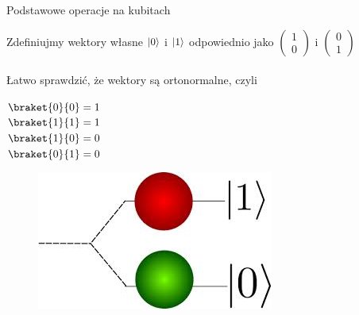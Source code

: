 \documentclass{beamer}
\DeclarePairedDelimiter\ket{\lvert}{\rangle}
\begin{document}
	
	\begin{frame}{Podstawowe operacje na kubitach}
		\begin{block}{   }
			\vspace{0.5em}
			Zdefiniujmy wektory własne $\ket{0}$ i $\ket{1}$ odpowiednio jako
			$\begin{pmatrix}
				1\\
				0
			\end{pmatrix}$
			i
			$\begin{pmatrix}
				0\\
				1
			\end{pmatrix}$
			\\~\\
			Łatwo sprawdzić, że wektory są ortonormalne, czyli
			\begin{multicols}{4}
				$\braket{0}{0} = 1$\\
				$\braket{1}{1} = 1$\\
				$\braket{1}{0} = 0$\\
				$\braket{0}{1} = 0$
			\end{multicols}
			\vspace{0.5em}
		\end{block}
	
		\begin{center}
			\begin{figure}
				\includegraphics[scale=0.53]{media/qubits.jpeg}
			\end{figure}
		\end{center}
	\end{frame}
\end{document}
